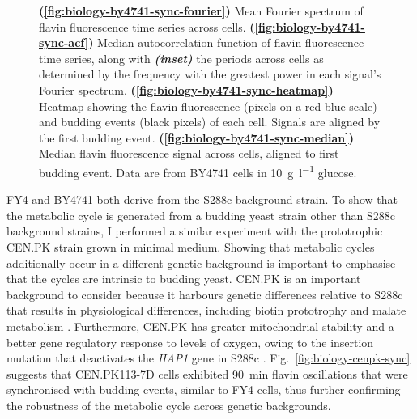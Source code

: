 \begin{figure}
  \caption[
    Mean Fourier spectrum of flavin fluorescence time series across cells.
    Median autocorrelation function of flavin fluorescence time series, along with the periods across cells.
    Heatmap showing the flavin fluorescence and budding events of each cell.
    Median flavin fluorescence signal across cells, aligned to first budding event.
    Data are from BY4741 cells in \SI{10}{\gram~\litre^{-1}} glucose.
  ]{
    \textbf{(\ref{fig:biology-by4741-sync-fourier})} Mean Fourier spectrum of flavin fluorescence time series across cells.
    \textbf{(\ref{fig:biology-by4741-sync-acf})} Median autocorrelation function of flavin fluorescence time series, along with \textit{\textbf{(inset)}} the periods across cells as determined by the frequency with the greatest power in each signal's Fourier spectrum.
    \textbf{(\ref{fig:biology-by4741-sync-heatmap})}
    Heatmap showing the flavin fluorescence (pixels on a red-blue scale) and budding events (black pixels) of each cell.
    Signals are aligned by the first budding event.
    \textbf{(\ref{fig:biology-by4741-sync-median})}
    Median flavin fluorescence signal across cells, aligned to first budding event.
    Data are from BY4741 cells in \SI{10}{\gram~\litre^{-1}} glucose.
  }
  \label{fig:biology-by4741-sync}
\end{figure}

FY4 and BY4741 both derive from the S288c background strain.
To show that the metabolic cycle is generated from a budding yeast strain other than S288c background strains, I performed a similar experiment with the prototrophic CEN.PK strain grown in minimal medium.
Showing that metabolic cycles additionally occur in a different genetic background is important to emphasise that the cycles are intrinsic to budding yeast.
CEN.PK is an important background to consider because it harbours genetic differences relative to S288c that results in physiological differences, including biotin prototrophy and malate metabolism \parencite{nijkampNovoSequencingAssembly2012}.
Furthermore, CEN.PK has greater mitochondrial stability and a better gene regulatory response to levels of oxygen, owing to the insertion mutation that deactivates the \textit{HAP1} gene in S288c \parencite{gaisneNaturalMutationSaccharomyces1999}.
Fig.\ \ref{fig:biology-cenpk-sync} suggests that CEN.PK113-7D cells exhibited \SI{90}{\minute} flavin oscillations that were synchronised with budding events, similar to FY4 cells, thus further confirming the robustness of the metabolic cycle across genetic backgrounds.

